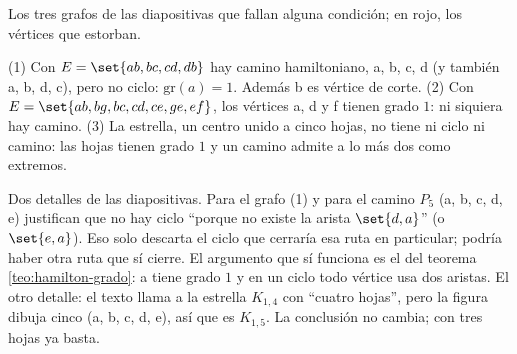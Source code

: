 \documentclass[11pt,letterpaper]{article}
\begin{document}
\begin{ejemplo}
  \label{ej:hamilton-no-pasan}
  Los tres grafos de las diapositivas que fallan alguna condición;
  en rojo, los vértices que estorban.
  \begin{center}
  \end{center}
  (1) Con $E = \set{ab, bc, cd, db}$ hay camino hamiltoniano, a, b, c,
  d (y también a, b, d, c), pero no ciclo: $\text{gr}(a) = 1$. Además
  b es vértice de corte. (2) Con
  $E = \set{ab, bg, bc, cd, ce, ge, ef}$, los vértices a, d y f tienen
  grado $1$: ni siquiera hay camino. (3) La estrella, un centro unido
  a cinco hojas, no tiene ni ciclo ni camino: las hojas tienen grado
  $1$ y un camino admite a lo más dos como extremos.
\end{ejemplo}

\begin{ojo}
  Dos detalles de las diapositivas. Para el grafo (1) y para el
  camino $P_5$ (a, b, c, d, e) justifican que no hay ciclo ``porque no
  existe la arista $\set{d, a}$'' (o $\set{e, a}$). Eso solo descarta
  el ciclo
  que cerraría esa ruta en particular; podría haber otra ruta que sí
  cierre. El argumento que sí funciona es el del teorema
  \ref{teo:hamilton-grado}: a tiene grado $1$ y en un ciclo todo
  vértice usa dos aristas. El otro detalle: el texto llama a la
  estrella $K_{1,4}$ con ``cuatro hojas'', pero la figura dibuja cinco
  (a, b, c, d, e), así que es $K_{1,5}$. La conclusión no cambia; con
  tres hojas ya basta.
\end{ojo}
\end{document}
